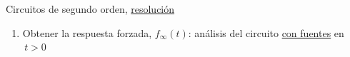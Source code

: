 \documentclass[aspectratio=169, usenames,svgnames,dvipsnames]{beamer}
\begin{document}
\begin{frame}{Circuitos de segundo orden, \hspace{3mm}\underline{resolución}}
\begin{enumerate}
        \begin{itemize}
            \normalsize
            \vspace{1mm}
            \item Son \alert{necesarias 2 condiciones iniciales}: una para la propia magnitud ($u(t)$ o $i(t)$) y otra para su primera derivada ($u'(t)$ o $i'(t)$)

            \vspace{1mm}
            \item Más detalles en ejercicios resueltos
        \end{itemize}
        
        \vspace{1mm}
        \item Obtener la \alert{respuesta forzada}, $f_\infty(t)$: \;\; análisis del circuito \underline{con fuentes} en \(\, t>0\)
    \end{enumerate}
\end{frame}




%
%

\end{document}
